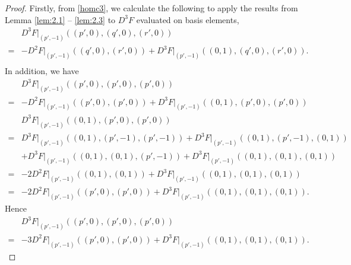 \documentclass[12pt]{article}
\numberwithin{equation}{section}
\theoremstyle{plain}
\theoremstyle{definition}
\theoremstyle{remark}
\begin{document}
\begin{proof}
Firstly, from \eqref{homc3}, we calculate the following to apply the results from Lemma \ref{lem:2.1} -- \ref{lem:2.3} to $D^3 F$ evaluated on basis elements,
\begin{equation*}
\begin{split}
     & D^3 F\Big|_{(p',-1)} ((p',0),(q',0),(r',0) ) \\
     = & - D^2 F\Big|_{(p',-1)} ((q',0), (r',0)) + D^3 F\Big|_{(p',-1)} ((0,1),(q',0),(r',0) ). \\
\end{split}
\end{equation*}
In addition, we have
\begin{equation*}
\begin{split}    
   &  D^3 F\Big|_{(p',-1)} ((p', 0), (p', 0), (p', 0)) \\
    = & - D^2 F\Big|_{(p',-1)} ((p', 0), (p', 0)) + D^3 F\Big|_{(p',-1)} ((0, 1), (p', 0), (p', 0)) \\
    & D^3 F\Big|_{(p',-1)} ((0, 1), (p', 0), (p', 0))  \\
    = & D^3 F\Big|_{(p',-1)} ((0, 1), (p', -1), (p', -1)) + D^3 F\Big|_{(p',-1)} ((0, 1), (p', -1), (0, 1)) \\
    & + D^3 F\Big|_{(p',-1)} ((0, 1), (0, 1), (p', -1)) + D^3 F\Big|_{(p',-1)} ((0, 1), (0, 1), (0, 1)) \\
    = & -2 D^2 F\Big|_{(p',-1)} ((0, 1), (0, 1)) + D^3 F\Big|_{(p',-1)} ((0, 1), (0, 1), (0, 1)) \\
    = & -2 D^2 F\Big|_{(p',-1)} ((p', 0), (p', 0)) + D^3 F\Big|_{(p',-1)} ((0, 1), (0, 1), (0, 1)).
\end{split}
\end{equation*}
Hence
\begin{equation*}
\begin{split}
    &  D^3 F\Big|_{(p',-1)} ((p', 0), (p', 0), (p', 0)) \\
    = & -3 D^2 F\Big|_{(p',-1)} ((p', 0), (p', 0)) + D^3 F\Big|_{(p',-1)} ((0, 1), (0, 1), (0, 1)).
\end{split}
\end{equation*}


\end{proof}
\end{document}
